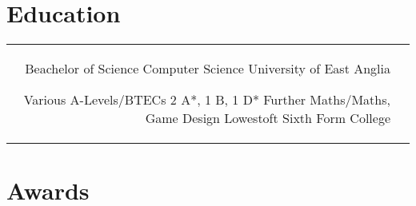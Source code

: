 \documentclass[10pt]{article} %
\begin{document}
\begin{paracol}{2}

\section{Education} 





\begin{supertabular}{rl} %

	
	{Beachelor of Science} %
	{} %
	{Computer Science} %
	{University of East Anglia} %
	
	
	{Various A-Levels/BTECs} %
	{2 A*, 1 B, 1 D*} %
	{Further Maths/Maths, Game Design} %
	{Lowestoft Sixth Form College} %
	

\end{supertabular}


\section{Awards}



\end{paracol}
\end{document}

